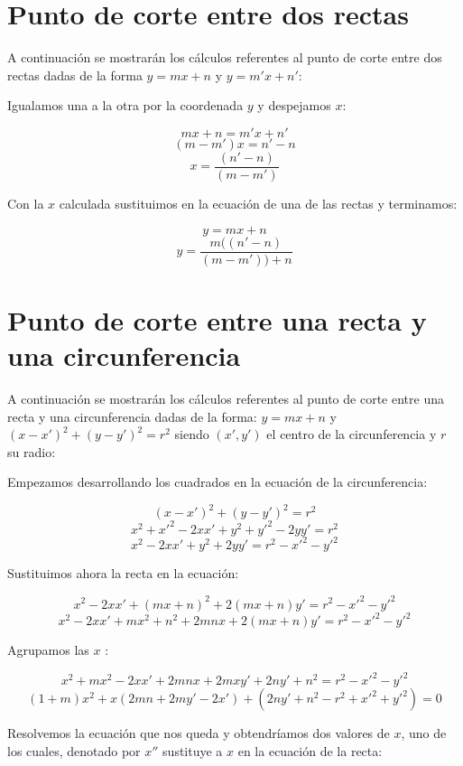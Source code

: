 
\section{Punto de corte entre dos rectas}\label{r-r}

A continuación se mostrarán los cálculos referentes al punto de corte entre dos rectas dadas de la forma $y = mx + n$ y $y = m'x + n'$: \par

Igualamos una a la otra por la coordenada $y$ y despejamos $x$:\par

$$mx+n = m'x+n'$$
$$(m-m')x = n'-n$$
$$x = \frac{(n'-n)}{(m-m')}$$

Con la $x$ calculada sustituimos en la ecuación de una de las rectas y terminamos:\par

$$y = mx+n$$
$$y = \frac{m((n'-n)}{(m-m')) + n}$$

\section{Punto de corte entre una recta y una circunferencia}\label{r-c}

A continuación se mostrarán los cálculos referentes al punto de corte entre una recta y una circunferencia dadas de la forma: $y = mx + n$ y $(x-x')^2 + (y -y')^2 = r^2$ siendo $(x', y')$ el centro de la circunferencia y $r$ su radio: \par

Empezamos desarrollando los cuadrados en la ecuación de la circunferencia:\par

$$(x-x')^2 + (y -y')^2 = r^2$$
$$x^2 + x'^2 - 2xx' + y^2 + y'^2 - 2yy' = r^2$$
$$x^2 - 2xx' + y^2 + 2yy' = r^2 - x'^2 - y'^2$$

Sustituimos ahora la recta en la ecuación:\par


$$x^2 - 2xx' + (mx + n)^2 + 2(mx + n)y' = r^2 - x'^2 - y'^2$$
$$x^2 - 2xx' + mx^2 + n^2 + 2mnx + 2(mx + n)y' = r^2 - x'^2 - y'^2$$

Agrupamos las $x$ :\par


$$x^2 + mx^2 - 2xx' + 2mnx + 2mxy' + 2ny' + n^2 = r^2 - x'^2 - y'^2$$
$$(1+m)x^2 + x( 2mn + 2my' - 2x' ) + (2ny' + n^2 - r^2 + x'^2 + y'^2) = 0$$

Resolvemos la ecuación que nos queda y obtendríamos dos valores de $x$, uno de los cuales, denotado por $x''$ sustituye a $x$ en la ecuación de la recta:\par

